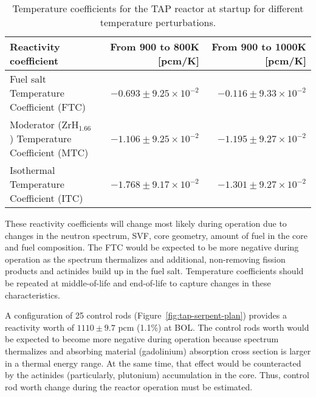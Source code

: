 \begin{table}[ht!]
	\caption{Temperature coefficients for the \gls{TAP} reactor at startup for 
	different temperature perturbations.}
	\begin{tabularx}{\textwidth}{ X  r r } \hline
		Reactivity coefficient     & From 900 to 800K [pcm/K] & From 900 to 
		1000K [pcm/K]                  \tabularnewline [5pt] \hline
		Fuel salt Temperature Coefficient (FTC) &
		$-0.693\pm9.25\times10^{-2}$ & $-0.116\pm9.33\times10^{-2}$ 
		\tabularnewline [5pt] \hline
		Moderator (ZrH$_{1.66}$) Temperature Coefficient (MTC) & 
		$-1.106\pm9.25\times10^{-2}$ & $-1.195\pm9.27\times10^{-2}$  
		\tabularnewline [5pt] \hline
		Isothermal Temperature Coefficient (ITC)  & 
		$-1.768\pm9.17\times10^{-2}$ &  $-1.301\pm9.27\times10^{-2}$  
		\tabularnewline [5pt] \hline
	\end{tabularx}
	\label{tab:tcoef}
\end{table}
These reactivity coefficients will change most likely during operation due to 
changes in the neutron spectrum, \gls{SVF}, core geometry, amount of fuel in 
the core and fuel composition. The FTC would be expected to be more negative 
during operation as the spectrum thermalizes and additional, non-removing 
fission products and actinides build up in the fuel salt. Temperature 
coefficients should be repeated at middle-of-life and end-of-life to capture 
changes in these characteristics.

A configuration of 25 control rods (Figure~\ref{fig:tap-serpent-plan}) 
provides a reactivity worth of $1110\pm9.7$ pcm (1.1\%) at \gls{BOL}. The 
control rods worth would be expected to become more negative during operation 
because spectrum thermalizes and absorbing material (gadolinium) absorption 
cross section is larger in a thermal energy range. At the same time, that 
effect would be counteracted by the actinides (particularly, plutonium) 
accumulation in the core. Thus, control rod worth change during the reactor 
operation must be estimated.
